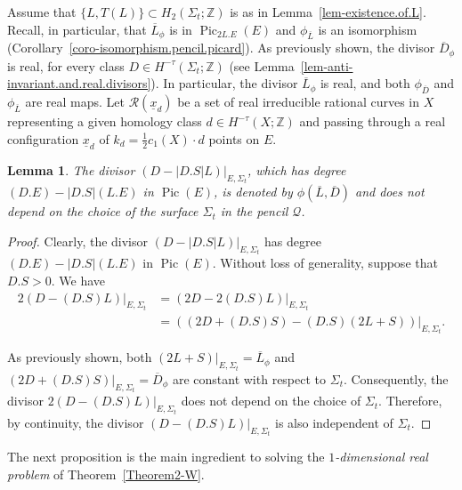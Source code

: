 \documentclass[11pt]{amsart}
\numberwithin{equation}{section}
\theoremstyle{definition}
\theoremstyle{plain}
\newtheorem{lemma}[definition]{Lemma}
\theoremstyle{remark}
\newcommand{\Z}{\mathbb{Z}}
\DeclareMathOperator{\Pic}{Pic}
\begin{document}
Assume that $\{L,T(L)\}\subset H_2(\Sigma_t;\Z)$ is as in  Lemma~\ref{lem-existence.of.L}. Recall, in particular, that $\overline{L}_{\phi}$ is  in $\Pic_{2L.E}(E)$ and $\phi_{\overline{L}}$ is an isomorphism (Corollary~\ref{coro-isomorphism.pencil.picard}). As previously shown, the divisor $\overline{D}_{\phi}$ is real, for every class $D \in H^{-\tau}(\Sigma_t;\Z)$ (see Lemma~\ref{lem-anti-invariant.and.real.divisors}). In particular, the divisor $\overline{L}_{\phi}$ is real, and both $\phi_{\overline{D}}$ and $\phi_{\overline{L}}$ are real maps.
Let $\mathcal{R}(\underline{x}_d)$ be a set of real irreducible rational curves in $X$ representing a given homology class $d\in H^{-\tau}(X;\Z)$ and passing through a real configuration $\underline{x}_d$ of $k_d=\frac{1}{2}c_1(X)\cdot d$ points on $E$.


\begin{lemma} \label{lem-constant.divisor.L.D}
The divisor $(D-|D.S|L)|_{E,\Sigma_t}$, which has degree $(D.E)-|D.S|(L.E)$ in $\Pic(E)$, is denoted by $\phi(\overline{L},\overline{D})$ and does not depend on the choice of the surface $\Sigma_t$ in the pencil $\mathcal{Q}$.
\end{lemma}


\begin{proof}
Clearly, the divisor  $(D-|D.S|L)|_{E,\Sigma_t}$ has degree $(D.E)-|D.S|(L.E)$ in $\Pic(E)$. Without loss of generality, suppose that $D.S> 0$. We have
  \begin{align*}
      2\left(D-(D.S)L\right)|_{E,\Sigma_t} &= \left(2D-2(D.S)L\right)|_{E,\Sigma_t}\\
      &= \left((2D+(D.S)S)-(D.S) (2L+S)\right) |_{E,\Sigma_t}.
  \end{align*}
   
As previously shown, both $(2L+S)|_{E,\Sigma_t}=\overline{L}_{\phi}$ and $(2D+(D.S)S)|_{E,\Sigma_t}=\overline{D}_{\phi}$ are constant with respect to $\Sigma_t$. Consequently, the divisor $ 2\left(D-(D.S)L\right)|_{E,\Sigma_t}$ does not depend on the choice of $\Sigma_t$. Therefore, by continuity, the divisor $ \left(D-(D.S)L\right)|_{E,\Sigma_t}$  is also independent of $\Sigma_t$. 
\end{proof}

The next proposition is the main ingredient to solving the \textit{$1$-dimensional real problem} of Theorem~\ref{Theorem2-W}.
\end{document}
